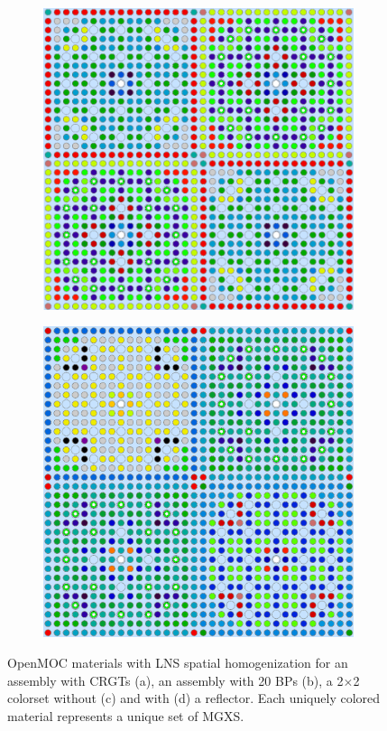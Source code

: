 \begin{figure}[h!]
\begin{subfigure}{.45\textwidth}
  \caption{}
  \label{fig:chap9-31-20BPs-lns-materials}
\end{subfigure}
\begin{subfigure}{.45\textwidth}
  \centering
  \includegraphics[width=0.9\linewidth]{figures/patterns/lns/2x2/materials}
  \caption{}
  \label{fig:chap9-2x2-lns-materials}
\end{subfigure}%
\begin{subfigure}{.45\textwidth}
  \centering
  \includegraphics[width=0.9\linewidth]{figures/patterns/lns/reflector/materials}
  \caption{}
  \label{fig:chap9-reflector-lns-materials}
\end{subfigure}
\caption[Depiction of LNS spatially homogenized materials]{OpenMOC materials with \ac{LNS} spatial homogenization for an assembly with \acp{CRGT} (a), an assembly with 20 \acp{BP} (b), a 2$\times$2 colorset without (c) and with (d) a reflector. Each uniquely colored material represents a unique set of \ac{MGXS}.}
\label{fig:chap9-lns-materials}
\end{figure}

